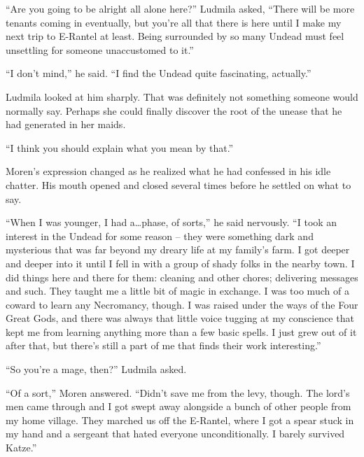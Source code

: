  

“Are you going to be alright all alone here?” Ludmila asked, “There will be more tenants coming in eventually, but you’re all that there is here until I make my next trip to E-Rantel at least. Being surrounded by so many Undead must feel unsettling for someone unaccustomed to it.”

 

“I don’t mind,” he said. “I find the Undead quite fascinating, actually.”

 

Ludmila looked at him sharply. That was definitely not something someone would normally say. Perhaps she could finally discover the root of the unease that he had generated in her maids.

 

“I think you should explain what you mean by that.”

 

Moren’s expression changed as he realized what he had confessed in his idle chatter. His mouth opened and closed several times before he settled on what to say.

 

“When I was younger, I had a…phase, of sorts,” he said nervously. “I took an interest in the Undead for some reason – they were something dark and mysterious that was far beyond my dreary life at my family’s farm. I got deeper and deeper into it until I fell in with a group of shady folks in the nearby town. I did things here and there for them: cleaning and other chores; delivering messages and such. They taught me a little bit of magic in exchange. I was too much of a coward to learn any Necromancy, though. I was raised under the ways of the Four Great Gods, and there was always that little voice tugging at my conscience that kept me from learning anything more than a few basic spells. I just grew out of it after that, but there’s still a part of me that finds their work interesting.”

 

“So you’re a mage, then?” Ludmila asked.

 

“Of a sort,” Moren answered. “Didn’t save me from the levy, though. The lord’s men came through and I got swept away alongside a bunch of other people from my home village. They marched us off the E-Rantel, where I got a spear stuck in my hand and a sergeant that hated everyone unconditionally. I barely survived Katze.”

 

